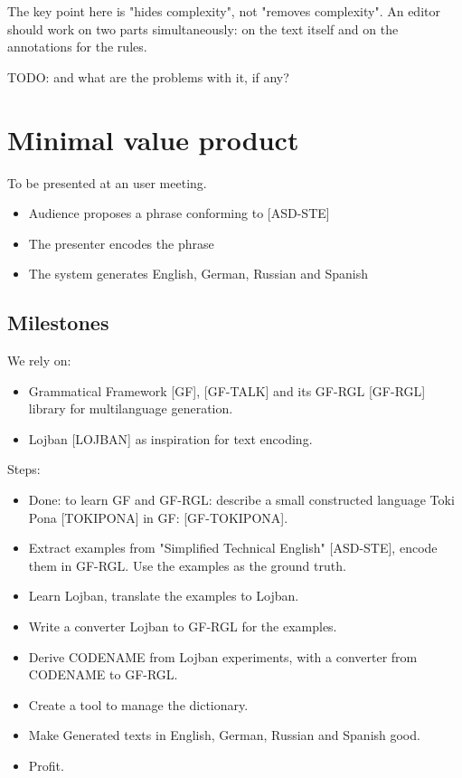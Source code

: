 \documentclass{article}
\begin{document}
The key point here is "hides complexity", not "removes complexity". An editor should work on two parts simultaneously: on the text itself and on the annotations for the rules.

TODO: and what are the problems with it, if any?

\section{Minimal value product}

To be presented at an user meeting.

\begin{itemize}
\item Audience proposes a phrase conforming to [ASD-STE]
\item The presenter encodes the phrase
\item The system generates English, German, Russian and Spanish
\end{itemize}

\subsection{Milestones}\label{milestones}

We rely on:

\begin{itemize}
\item Grammatical Framework [GF], [GF-TALK] and its GF-RGL [GF-RGL] library for multilanguage generation.
\item Lojban [LOJBAN] as inspiration for text encoding.
\end{itemize}

Steps:

\begin{itemize}
\item Done: to learn GF and GF-RGL: describe a small constructed language Toki Pona [TOKIPONA] in GF: [GF-TOKIPONA].
\item Extract examples from "Simplified Technical English" [ASD-STE], encode them in GF-RGL. Use the examples as the ground truth.
\item Learn Lojban, translate the examples to Lojban.
\item Write a converter Lojban to GF-RGL for the examples.
\item Derive CODENAME from Lojban experiments, with a converter from CODENAME to GF-RGL.
\item Create a tool to manage the dictionary.
\item Make Generated texts in English, German, Russian and Spanish good.
\item Profit.
\end{itemize}
\end{document}
